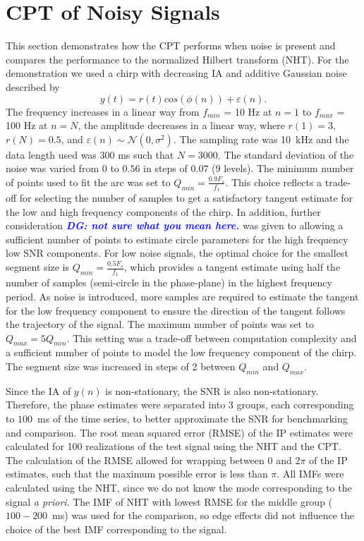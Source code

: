 \documentclass[journal,11pt,a4paper,onecolumn,draftcls]{IEEEtran}
\newcommand{\todo}[1]{\textsf{\emph{\textbf{\textcolor{blue}{#1}}}}}
\begin{document}
\section{CPT of Noisy Signals}\label{sect:NoisySignalsSection}
This section demonstrates how the CPT performs when noise is present and compares the performance to the normalized Hilbert transform (NHT). For the demonstration we used a chirp with decreasing IA and additive Gaussian noise described by
\begin{equation}
    y(t)=r\left(t\right)cos\left(\phi\left(n\right)\right) + \varepsilon \left( n \right).
\end{equation}
The frequency increases in a linear way from $f_{min}$ = 10 Hz at $n=1$ to $f_{max}$ = 100 Hz at $n=N$, the amplitude decreases in a linear way, where $r(1) = 3$, $r(N) = 0.5$, and $\varepsilon(n) \sim \mathcal{N}(0,\sigma^2)$. The sampling rate was 10~kHz and the data length used was 300 ms such that $N = 3000$. The standard deviation of the noise was varied from $0$ to $0.56$ in steps of $0.07$ (9 levels). The minimum number of points used to fit the arc was set to $Q_{min}=\frac{0.9F_s}{f_1}$. This choice reflects a trade-off for selecting the number of samples to get a satisfactory tangent estimate for the low and high frequency components of the chirp. In addition, further consideration \todo{DG: not sure what you mean here.} was given to allowing a sufficient number of points to estimate circle parameters for the high frequency low SNR components. For low noise signals, the optimal choice for the smallest segment size is $Q_{min}=\frac{0.5F_s}{f_1}$, which provides a tangent estimate using half the number of samples (semi-circle in the phase-plane) in the highest frequency period. As noise is introduced, more samples are required to estimate the tangent for the low frequency component to ensure the direction of the tangent follows the trajectory of the signal. The maximum number of points was set to $Q_{max} = 5Q_{min}$. This setting was a trade-off between computation complexity and a sufficient number of points to model the low frequency component of the chirp. The segment size was increased in steps of 2 between $Q_{min}$ and $Q_{max}$.

Since the IA of $y(n)$ is non-stationary, the SNR is also non-stationary. Therefore, the phase estimates were separated into $3$ groups, each corresponding to $100$~ms of the time series, to better approximate the SNR for benchmarking and comparison. The root mean squared error (RMSE) of the IP estimates were calculated for 100 realizations of the test signal using the NHT and the CPT. The calculation of the RMSE allowed for wrapping between $0$ and $2\pi$ of the IP estimates, such that the maximum possible error is less than $\pi$. All IMFs were calculated using the NHT, since we do not know the mode corresponding to the signal \emph{a priori}. The IMF of NHT with lowest RMSE for the middle group ($100-200$~ms) was used for the comparison, so edge effects did not influence the choice of the best IMF corresponding to the signal. 
\end{document}
